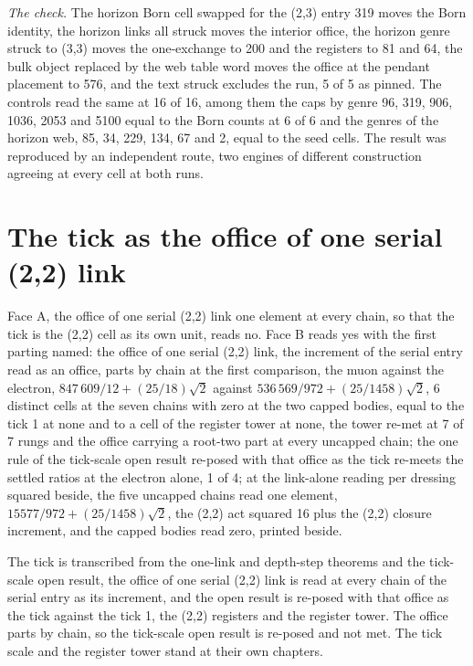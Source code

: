 \begin{chproof}
\textit{The check.} The horizon Born cell swapped for the (2,3) entry 319 moves the Born identity, the horizon links all struck moves the interior office, the horizon genre struck to (3,3) moves the one-exchange to 200 and the registers to 81 and 64, the bulk object replaced by the web table word moves the office at the pendant placement to 576, and the text struck excludes the run, 5 of 5 as pinned. The controls read the same at 16 of 16, among them the caps by genre 96, 319, 906, 1036, 2053 and 5100 equal to the Born counts at 6 of 6 and the genres of the horizon web, 85, 34, 229, 134, 67 and 2, equal to the seed cells. The result was reproduced by an independent route, two engines of different construction agreeing at every cell at both runs.
\end{chproof}
\section{The tick as the office of one serial (2,2) link}\label{mod:X-6-D542582-w-tktu}
\begin{chwall}\label{box:X-6-D542582-w-tktu:1}
Face A, the office of one serial (2,2) link one element at every chain, so that the tick is the (2,2) cell as its own unit, reads no. Face B reads yes with the first parting named: the office of one serial (2,2) link, the increment of the serial entry read as an office, parts by chain at the first comparison, the muon against the electron, $847\,609/12 + (25/18)\sqrt{2}$ against $536\,569/972 + (25/1458)\sqrt{2}$, 6 distinct cells at the seven chains with zero at the two capped bodies, equal to the tick 1 at none and to a cell of the register tower at none, the tower re-met at 7 of 7 rungs and the office carrying a root-two part at every uncapped chain; the one rule of the tick-scale open result re-posed with that office as the tick re-meets the settled ratios at the electron alone, 1 of 4; at the link-alone reading per dressing squared beside, the five uncapped chains read one element, $15577/972 + (25/1458)\sqrt{2}$, the (2,2) act squared 16 plus the (2,2) closure increment, and the capped bodies read zero, printed beside.
\end{chwall}
The tick is transcribed from the one-link and depth-step theorems and the tick-scale open result, the office of one serial (2,2) link is read at every chain of the serial entry as its increment, and the open result is re-posed with that office as the tick against the tick 1, the (2,2) registers and the register tower. The office parts by chain, so the tick-scale open result is re-posed and not met. The tick scale and the register tower stand at their own chapters.
